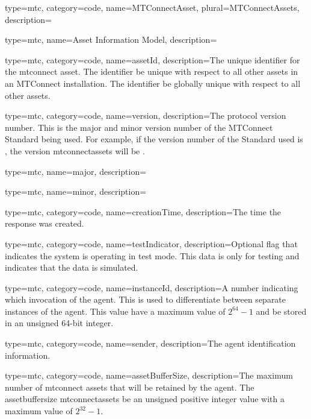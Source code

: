 {
  type=mtc,
  category=code,
  name={MTConnectAsset},
  plural={MTConnectAssets},
  description={}
}


{
  type=mtc,
  name={Asset Information Model},
  description={}
}


{
  type=mtc,
  category=code,
  name={assetId},
  description={The unique identifier for the \gls{mtconnect asset}. The identifier \MUST be unique with respect to all other \glspl{asset} in an MTConnect installation. The identifier \SHOULD be globally unique with respect to all other \glspl{asset}.}
}


{
  type=mtc,
  category=code,
  name={version},
  description={The protocol version number. This is the \gls{major} and \gls{minor} version number of the MTConnect Standard being used. For example, if the version number of the Standard used is , the \gls{version mtconnectassets} will be .}
}


{
  type=mtc,
  name={major},
  description={}
}


{
  type=mtc,
  name={minor},
  description={}
}


{
  type=mtc,
  category=code,
  name={creationTime},
  description={The time the response was created. }
}


{
  type=mtc,
  category=code,
  name={testIndicator},
  description={Optional flag that indicates the system is operating in test mode. This data is only for testing and indicates that the data is simulated. }
}


{
  type=mtc,
  category=code,
  name={instanceId},
  description={A number indicating which invocation of the \gls{agent}. This is used to differentiate between separate instances of the \gls{agent}. This value \MUST have a maximum value of $2^{64}-1$ and \MUST be stored in an unsigned 64-bit integer. }
}


{
  type=mtc,
  category=code,
  name={sender},
  description={The \gls{agent} identification information. }
}


{
  type=mtc,
  category=code,
  name={assetBufferSize},
  description={The maximum number of \glspl{mtconnect asset} that will be retained by the \gls{agent}. The \gls{assetbuffersize mtconnectassets} \MUST be an unsigned positive integer value with a maximum value of $2^{32}-1$. }
}


